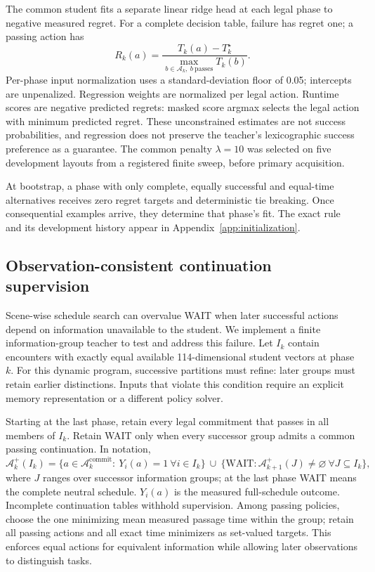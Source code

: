 \documentclass[10pt]{article}
\newcommand{\A}{\mathcal{A}}
\begin{document}
The common student fits a separate linear ridge head at each legal phase to
negative measured regret. For a complete decision table, failure has regret one;
a passing action has
\begin{equation}
 R_k(a)=\frac{T_k(a)-T_k^\star}
 {\max_{b\in\A_k,\ b\ \mathrm{passes}}T_k(b)}.
\end{equation}
Per-phase input normalization uses a standard-deviation floor of 0.05; intercepts
are unpenalized. Regression weights are normalized per legal action. Runtime
scores are negative predicted regrets: masked score argmax selects the legal
action with minimum predicted regret. These
unconstrained estimates are not success probabilities, and regression does not
preserve the teacher's lexicographic success preference as a guarantee. The
common penalty $\lambda=10$ was selected on five development layouts from a
registered finite sweep, before primary acquisition.

At bootstrap, a phase with only complete, equally successful and equal-time
alternatives receives zero regret targets and deterministic tie breaking. Once
consequential examples arrive, they determine that phase's fit. The exact rule
and its development history appear in Appendix~\ref{app:initialization}.

\subsection{Observation-consistent continuation supervision}
Scene-wise schedule search can overvalue WAIT when later successful actions
depend on information unavailable to the student. We implement a finite
information-group teacher to test and address this failure. Let $I_k$ contain
encounters with exactly equal available 114-dimensional student vectors at phase
$k$. For this dynamic program, successive partitions must refine: later groups
must retain earlier distinctions. Inputs that violate this condition require
an explicit memory representation or a different policy solver.

Starting at the last phase, retain every legal commitment that passes in all
members of $I_k$. Retain WAIT only when every successor group admits a common
passing continuation. In notation,
\begin{equation}
 \A_k^+(I_k)=\{a\in\A_k^{\mathrm{commit}}:\ Y_i(a)=1\ \forall i\in I_k\}
 \ \cup\ \{\mathrm{WAIT}:\A_{k+1}^+(J)\ne\varnothing\ \forall J\subseteq I_k\},
\end{equation}
where $J$ ranges over successor information groups; at the last phase WAIT
means the complete neutral schedule. $Y_i(a)$ is the measured full-schedule
outcome. Incomplete continuation tables withhold supervision. Among passing
policies, choose the one minimizing mean measured passage time within the group;
retain all passing actions and all exact time minimizers as set-valued targets.
This enforces equal actions for equivalent information while allowing later
observations to distinguish tasks.
\end{document}
